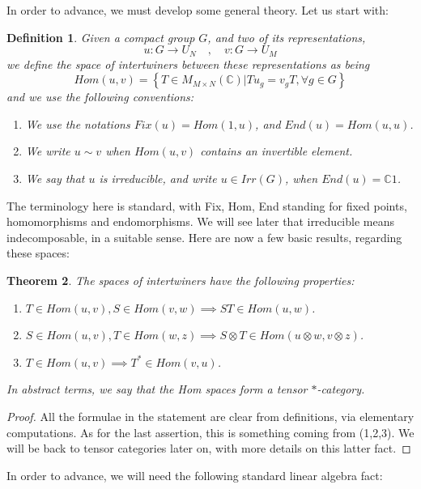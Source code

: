 \documentclass[12pt]{amsbook}
\newtheorem{theorem}{Theorem}[chapter]
\newtheorem{definition}[theorem]{Definition}
\begin{document}
In order to advance, we must develop some general theory. Let us start with:

\begin{definition}
Given a compact group $G$, and two of its representations,
$$u:G\to U_N\quad,\quad 
v:G\to U_M$$
we define the space of intertwiners between these representations as being 
$$Hom(u,v)=\left\{T\in M_{M\times N}(\mathbb C)\Big|Tu_g=v_gT,\forall g\in G\right\}$$
and we use the following conventions:
\begin{enumerate}
\item We use the notations $Fix(u)=Hom(1,u)$, and $End(u)=Hom(u,u)$.

\item We write $u\sim v$ when $Hom(u,v)$ contains an invertible element.

\item We say that $u$ is irreducible, and write $u\in Irr(G)$, when $End(u)=\mathbb C1$.
\end{enumerate}
\end{definition}

The terminology here is standard, with Fix, Hom, End standing for fixed points, homomorphisms and endomorphisms. We will see later that irreducible means indecomposable, in a suitable sense. Here are now a few basic results, regarding these spaces:

\begin{theorem}
The spaces of intertwiners have the following properties:
\begin{enumerate}
\item $T\in Hom(u,v),S\in Hom(v,w)\implies ST\in Hom(u,w)$.

\item $S\in Hom(u,v),T\in Hom(w,z)\implies S\otimes T\in Hom(u\otimes w,v\otimes z)$.

\item $T\in Hom(u,v)\implies T^*\in Hom(v,u)$.
\end{enumerate}
In abstract terms, we say that the Hom spaces form a tensor $*$-category.
\end{theorem}

\begin{proof}
All the formulae in the statement are clear from definitions, via elementary computations. As for the last assertion, this is something coming from (1,2,3). We will be back to tensor categories later on, with more details on this latter fact.
\end{proof}

In order to advance, we will need the following standard linear algebra fact:
\end{document}
